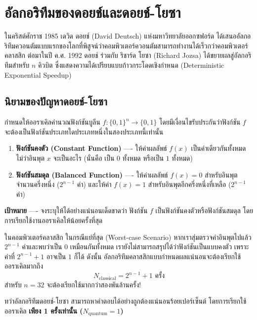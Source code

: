 \section{อัลกอริทึมของดอยช์และดอยช์-โยซา}

ในคริสต์ศักราช 1985 เดวิด ดอยช์ (David Deutsch) แห่งมหาวิทยาลัยออกซฟอร์ด ได้เสนออัลกอริทึมควอนตัมแบบแรกของโลกที่พิสูจน์ว่าคอมพิวเตอร์ควอนตัมสามารถทำงานได้เร็วกว่าคอมพิวเตอร์คลาสสิก ต่อมาในปี ค.ศ. 1992 ดอยช์ ร่วมกับ ริชาร์ด โยซา (Richard Jozsa) ได้ขยายผลสู่อัลกอริทึมสำหรับ $n$ คิวบิต ซึ่งแสดงความได้เปรียบแบบก้าวกระโดดเชิงกำหนด (Deterministic Exponential Speedup)

\subsection{นิยามของปัญหาดอยช์-โยซา}
กำหนดให้ออราเคิลคำนวณฟังก์ชันบูลีน $f: \{0, 1\}^n \to \{0, 1\}$ โดยมีเงื่อนไขรับประกันว่าฟังก์ชัน $f$ จะต้องเป็นฟังก์ชันประเภทใดประเภทหนึ่งในสองประเภทนี้เท่านั้น
\begin{enumerate}
    \item \textbf{ฟังก์ชันคงตัว (Constant Function)} ---- ให้ค่าผลลัพธ์ $f(x)$ เป็นค่าเดียวกันทั้งหมด ไม่ว่าอินพุต $x$ จะเป็นอะไร (นั่นคือ เป็น $0$ ทั้งหมด หรือเป็น $1$ ทั้งหมด)
    \item \textbf{ฟังก์ชันสมดุล (Balanced Function)} ---- ให้ค่าผลลัพธ์ $f(x) = 0$ สำหรับอินพุตจำนวนครึ่งหนึ่ง ($2^{n-1}$ ค่า) และให้ค่า $f(x) = 1$ สำหรับอินพุตอีกครึ่งหนึ่งที่เหลือ ($2^{n-1}$ ค่า)
\end{enumerate}
\textbf{เป้าหมาย} ---- จงระบุให้ได้อย่างแน่นอนเด็ดขาดว่า ฟังก์ชัน $f$ เป็นฟังก์ชันคงตัวหรือฟังก์ชันสมดุล โดยการเรียกใช้งานออราเคิลให้น้อยครั้งที่สุด

ในคอมพิวเตอร์คลาสสิก ในกรณีแย่ที่สุด (Worst-case Scenario) หากเราสุ่มตรวจค่าอินพุตไปแล้ว $2^{n-1}$ ค่าและพบว่าเป็น $0$ เหมือนกันทั้งหมด เรายังไม่สามารถสรุปได้ว่าฟังก์ชันเป็นแบบคงตัว เพราะค่าที่ $2^{n-1}+1$ อาจเป็น $1$ ก็ได้ ดังนั้น อัลกอริทึมคลาสสิกแบบกำหนดผลแน่นอนจะต้องเรียกใช้ออราเคิลมากถึง
\begin{equation}
N_{\text{classical}} = 2^{n-1} + 1 \text{ ครั้ง}
\end{equation}
สำหรับ $n = 32$ จะต้องเรียกใช้มากกว่าสองพันล้านครั้ง!

ทว่าอัลกอริทึมดอยช์-โยซา สามารถหาคำตอบได้อย่างถูกต้องแน่นอนร้อยเปอร์เซ็นต์ โดยการเรียกใช้ออราเคิล \textbf{เพียง 1 ครั้งเท่านั้น ($N_{\text{quantum}} = 1$)}

